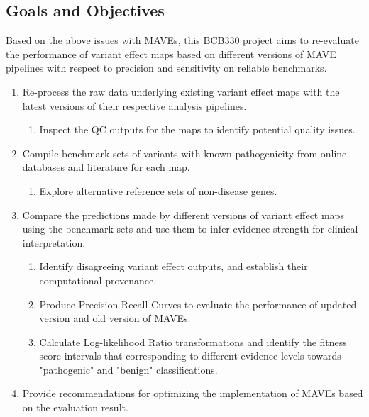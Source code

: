 \documentclass{article}
\begin{document}
\subsection{Goals and Objectives}
Based on the above issues with MAVEs, this BCB330 project aims to re-evaluate the performance of variant effect maps based on different versions of MAVE pipelines with respect to precision and sensitivity on reliable benchmarks.

\begin{enumerate}
    \item Re-process the raw data underlying existing variant effect maps with the latest versions of their respective analysis pipelines.
    \begin{enumerate}
        \item Inspect the QC outputs for the maps to identify potential quality issues.
    \end{enumerate}
    \item Compile benchmark sets of variants with known pathogenicity from online databases and literature for each map.
    \begin{enumerate}
        \item Explore alternative reference sets of non-disease genes.
    \end{enumerate}
    \item Compare the predictions made by different versions of variant effect maps using the benchmark sets and use them to infer evidence strength for clinical interpretation.
    \begin{enumerate}
        \item Identify disagreeing variant effect outputs, and establish their computational provenance.
        \item Produce Precision-Recall Curves to evaluate the performance of updated version and old version of MAVEs.
        \item Calculate Log-likelihood Ratio transformations and identify the fitness score intervals that corresponding to different evidence levels towards "pathogenic" and "benign" classifications. 
    \end{enumerate}
    \item Provide recommendations for optimizing the implementation of MAVEs based on the evaluation result.
\end{enumerate}
\end{document}

